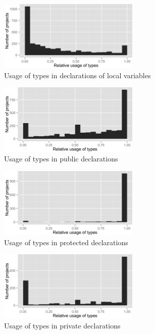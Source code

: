 \begin{figure}[h]
\centering 
\includegraphics[width=0.6\textwidth]{../aosd_2014/analysis/result/background/static-and-dynamic/histograms/6_Local_Variable.png} 
\caption{Usage of types in declarations of local variables}
\end{figure}

\begin{figure}[h]
\centering 
\includegraphics[width=0.6\textwidth]{../aosd_2014/analysis/result/background/static-and-dynamic/histograms/13_Public.png} 
\caption{Usage of types in public declarations}
\end{figure}

\begin{figure}[h]
\centering 
\includegraphics[width=0.6\textwidth]{../aosd_2014/analysis/result/background/static-and-dynamic/histograms/12_Protected.png} 
\caption{Usage of types in protected declarations}
\end{figure}

\begin{figure}[h]
\centering 
\includegraphics[width=0.6\textwidth]{../aosd_2014/analysis/result/background/static-and-dynamic/histograms/11_Private.png} 
\caption{Usage of types in private declarations}
\end{figure}

